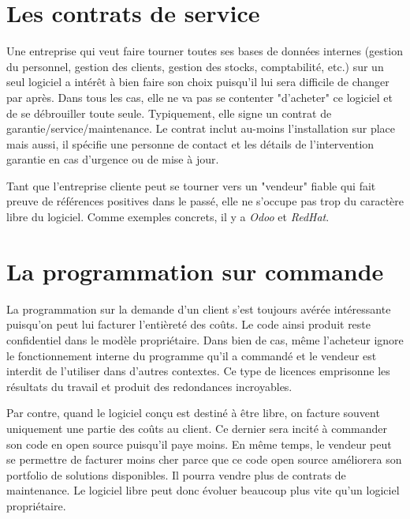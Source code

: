 \documentclass[10pt]{../fiche}
\begin{document}
\section*{Les contrats de service}
Une entreprise qui veut faire tourner toutes ses bases de données internes (gestion du personnel,
gestion des clients, gestion des stocks, comptabilité, etc.) sur un seul logiciel a intérêt à bien faire son choix puisqu'il lui sera difficile de changer par après. %
Dans tous les cas, elle ne va pas se contenter "d'acheter" ce logiciel et de se débrouiller toute seule.
Typiquement, elle signe un contrat de garantie/service/maintenance. %
Le contrat inclut au-moins l'installation sur place mais aussi, il spécifie une personne de contact et les détails de l'intervention garantie en cas d'urgence ou de mise à jour.

Tant que l'entreprise cliente peut se tourner vers un "vendeur" fiable qui fait preuve de références
positives dans le passé, elle ne s'occupe pas trop du caractère libre du logiciel.
Comme exemples concrets, il y a \textit{Odoo} et \textit{RedHat}.

\section*{La programmation sur commande}
La programmation sur la demande d'un client %
s'est toujours avérée intéressante puisqu'on
peut lui facturer l'entièreté des coûts. Le code ainsi produit reste confidentiel dans le
modèle propriétaire. Dans bien de cas, même l'acheteur ignore le fonctionnement
interne du programme qu'il a commandé et le vendeur est interdit de l'utiliser dans d'autres contextes.
Ce type de licences emprisonne les résultats du travail et produit des redondances incroyables.

Par contre, quand le logiciel conçu est destiné à être libre, on facture souvent uniquement une partie
des coûts au client. Ce dernier sera incité à commander son code en open source puisqu'il paye moins. %
En même temps, le vendeur peut se permettre de facturer moins cher parce que ce code open source
améliorera son portfolio de solutions disponibles. Il pourra vendre plus de contrats de maintenance.
Le logiciel libre peut donc évoluer beaucoup plus vite qu'un logiciel propriétaire.
\end{document}
